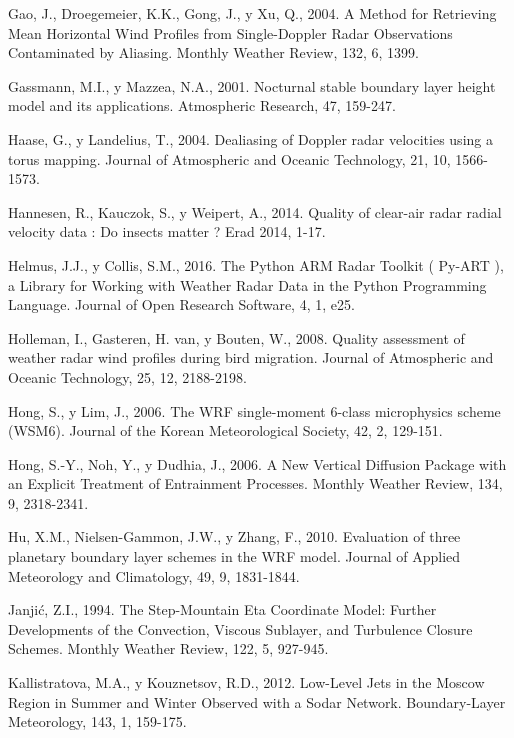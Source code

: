 \documentclass[12pt,spanish,oneside]{book}
\begin{document}
\hypertarget{ref-Gao2004a}{}
Gao, J., Droegemeier, K.K., Gong, J., y Xu, Q., 2004. A Method for
Retrieving Mean Horizontal Wind Profiles from Single-Doppler Radar
Observations Contaminated by Aliasing. Monthly Weather Review, 132, 6,
1399.

\hypertarget{ref-Gassmann2001}{}
Gassmann, M.I., y Mazzea, N.A., 2001. Nocturnal stable boundary layer
height model and its applications. Atmospheric Research, 47, 159-247.

\hypertarget{ref-Haase2004}{}
Haase, G., y Landelius, T., 2004. Dealiasing of Doppler radar velocities
using a torus mapping. Journal of Atmospheric and Oceanic Technology,
21, 10, 1566-1573.

\hypertarget{ref-Hannesen2014}{}
Hannesen, R., Kauczok, S., y Weipert, A., 2014. Quality of clear-air
radar radial velocity data : Do insects matter ? Erad 2014, 1-17.

\hypertarget{ref-Helmus2016}{}
Helmus, J.J., y Collis, S.M., 2016. The Python ARM Radar Toolkit (
Py-ART ), a Library for Working with Weather Radar Data in the Python
Programming Language. Journal of Open Research Software, 4, 1, e25.

\hypertarget{ref-Holleman2008}{}
Holleman, I., Gasteren, H. van, y Bouten, W., 2008. Quality assessment
of weather radar wind profiles during bird migration. Journal of
Atmospheric and Oceanic Technology, 25, 12, 2188-2198.

\hypertarget{ref-Hong2006a}{}
Hong, S., y Lim, J., 2006. The WRF single-moment 6-class microphysics
scheme (WSM6). Journal of the Korean Meteorological Society, 42, 2,
129-151.

\hypertarget{ref-Hong2006}{}
Hong, S.-Y., Noh, Y., y Dudhia, J., 2006. A New Vertical Diffusion
Package with an Explicit Treatment of Entrainment Processes. Monthly
Weather Review, 134, 9, 2318-2341.

\hypertarget{ref-Hu2010}{}
Hu, X.M., Nielsen-Gammon, J.W., y Zhang, F., 2010. Evaluation of three
planetary boundary layer schemes in the WRF model. Journal of Applied
Meteorology and Climatology, 49, 9, 1831-1844.

\hypertarget{ref-Janjic1994}{}
Janjić, Z.I., 1994. The Step-Mountain Eta Coordinate Model: Further
Developments of the Convection, Viscous Sublayer, and Turbulence Closure
Schemes. Monthly Weather Review, 122, 5, 927-945.

\hypertarget{ref-Kallistratova2012}{}
Kallistratova, M.A., y Kouznetsov, R.D., 2012. Low-Level Jets in the
Moscow Region in Summer and Winter Observed with a Sodar Network.
Boundary-Layer Meteorology, 143, 1, 159-175.
\end{document}
